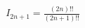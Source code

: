\documentclass[preview]{standalone}
\begin{document}
\begin{align*}
I_{2n+1} = \frac{(2n)!!}{(2n+1)!!}
\end{align*}
\end{document}
